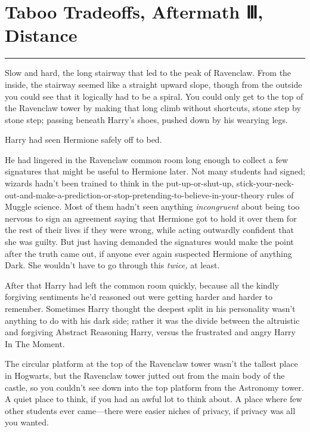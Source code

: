 \chapter{Taboo Tradeoffs, Aftermath Ⅲ,
Distance}\label{taboo-tradeoffs-aftermath-distance}

\begin{center}\rule{3in}{0.4pt}\end{center}

Slow and hard, the long stairway that led to the peak of Ravenclaw. From
the inside, the stairway seemed like a straight upward slope, though
from the outside you could see that it logically had to be a spiral. You
could only get to the top of the Ravenclaw tower by making that long
climb without shortcuts, stone step by stone step; passing beneath
Harry's shoes, pushed down by his wearying legs.

Harry had seen Hermione safely off to bed.

He had lingered in the Ravenclaw common room long enough to collect a
few signatures that might be useful to Hermione later. Not many students
had signed; wizards hadn't been trained to think in the
put-up-or-shut-up,
stick-your-neck-out-and-make-a-prediction-or-stop-pretending-to-believe-in-your-theory
rules of Muggle science. Most of them hadn't seen anything
\emph{incongruent} about being too nervous to sign an agreement saying
that Hermione got to hold it over them for the rest of their lives if
they were wrong, while acting outwardly confident that she was guilty.
But just having demanded the signatures would make the point after the
truth came out, if anyone ever again suspected Hermione of anything
Dark. She wouldn't have to go through this \emph{twice,} at least.

After that Harry had left the common room quickly, because all the
kindly forgiving sentiments he'd reasoned out were getting harder and
harder to remember. Sometimes Harry thought the deepest split in his
personality wasn't anything to do with his dark side; rather it was the
divide between the altruistic and forgiving Abstract Reasoning Harry,
versus the frustrated and angry Harry In The Moment.

The circular platform at the top of the Ravenclaw tower wasn't the
tallest place in Hogwarts, but the Ravenclaw tower jutted out from the
main body of the castle, so you couldn't see down into the top platform
from the Astronomy tower. A quiet place to think, if you had an awful
lot to think about. A place where few other students ever came---there
were easier niches of privacy, if privacy was all you wanted.

